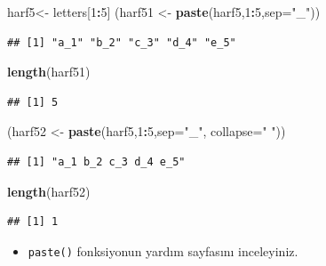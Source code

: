 \documentclass[
  oneside]{book}
\newenvironment{Shaded}{\begin{snugshade}}{\end{snugshade}}
\newcommand{\AttributeTok}[1]{\textcolor[rgb]{0.13,0.29,0.53}{#1}}
\newcommand{\DecValTok}[1]{\textcolor[rgb]{0.00,0.00,0.81}{#1}}
\newcommand{\FunctionTok}[1]{\textcolor[rgb]{0.13,0.29,0.53}{\textbf{#1}}}
\newcommand{\NormalTok}[1]{#1}
\newcommand{\OtherTok}[1]{\textcolor[rgb]{0.56,0.35,0.01}{#1}}
\newcommand{\SpecialCharTok}[1]{\textcolor[rgb]{0.81,0.36,0.00}{\textbf{#1}}}
\newcommand{\StringTok}[1]{\textcolor[rgb]{0.31,0.60,0.02}{#1}}
\providecommand{\tightlist}{%
  \setlength{\itemsep}{0pt}\setlength{\parskip}{0pt}}
\begin{document}
\begin{Shaded}
\begin{Highlighting}[]
\NormalTok{harf5}\OtherTok{\textless{}{-}}\NormalTok{ letters[}\DecValTok{1}\SpecialCharTok{:}\DecValTok{5}\NormalTok{]}
\NormalTok{(harf51 }\OtherTok{\textless{}{-}} \FunctionTok{paste}\NormalTok{(harf5,}\DecValTok{1}\SpecialCharTok{:}\DecValTok{5}\NormalTok{,}\AttributeTok{sep=}\StringTok{"\_"}\NormalTok{))}
\end{Highlighting}
\end{Shaded}

\begin{verbatim}
## [1] "a_1" "b_2" "c_3" "d_4" "e_5"
\end{verbatim}

\begin{Shaded}
\begin{Highlighting}[]
\FunctionTok{length}\NormalTok{(harf51)}
\end{Highlighting}
\end{Shaded}

\begin{verbatim}
## [1] 5
\end{verbatim}

\begin{Shaded}
\begin{Highlighting}[]
\NormalTok{(harf52 }\OtherTok{\textless{}{-}} \FunctionTok{paste}\NormalTok{(harf5,}\DecValTok{1}\SpecialCharTok{:}\DecValTok{5}\NormalTok{,}\AttributeTok{sep=}\StringTok{"\_"}\NormalTok{,}
                 \AttributeTok{collapse=}\StringTok{" "}\NormalTok{))}
\end{Highlighting}
\end{Shaded}

\begin{verbatim}
## [1] "a_1 b_2 c_3 d_4 e_5"
\end{verbatim}

\begin{Shaded}
\begin{Highlighting}[]
\FunctionTok{length}\NormalTok{(harf52)}
\end{Highlighting}
\end{Shaded}

\begin{verbatim}
## [1] 1
\end{verbatim}

\begin{itemize}
\tightlist
\item
  \texttt{paste()} fonksiyonun yardım sayfasını inceleyiniz.
\end{itemize}
\end{document}
